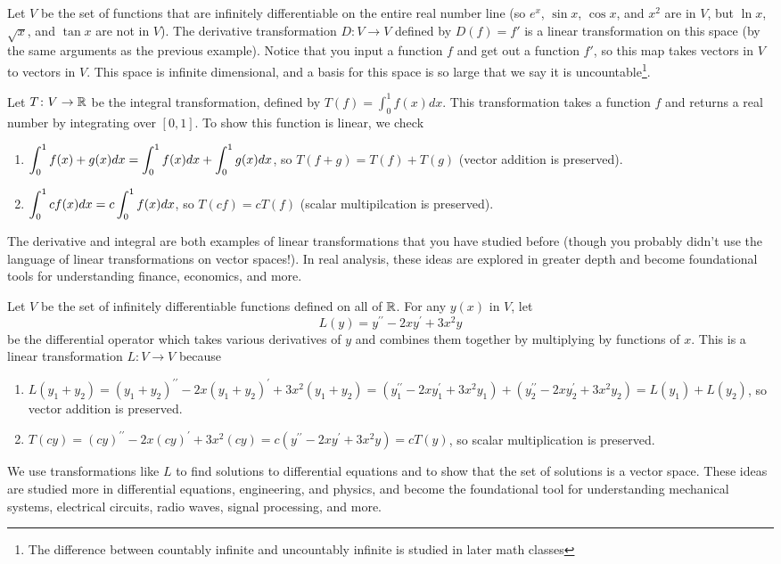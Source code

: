 \begin{example}
Let $V$ be the set of functions that are infinitely differentiable on the entire real number line (so $e^x$, $\sin x$, $\cos x$, and $x^2$ are in $V$, but $\ln x$, $\sqrt{x}$, and $\tan x$ are not in $V$). 
The derivative transformation $D\colon V\to V$ defined by $D(f) = f'$ is a linear transformation on this space (by the same arguments as the previous example). Notice that you input a function $f$ and get out a function $f'$, so this map takes vectors in $V$ to vectors in $V$.  This space is infinite dimensional, and a basis for this space is so large that we say it is uncountable\footnote{The difference between countably infinite and uncountably infinite is studied in later math classes}.

Let $T\colon V\to \mathbb{R}$ be the integral transformation, defined by $T(f)=\int_0^1 f(x)dx$.  This transformation takes a function $f$ and returns a real number by integrating over $[0,1]$.  To show this function is linear, we check
\begin{enumerate}
	\item $\displaystyle \int_0^1 f(x)+g(x)dx=\int_0^1 f(x)dx+\int_0^1 g(x)dx$, so $T(f+g)= T(f)+T(g)$ (vector addition is preserved).
	\item $\displaystyle \int_0^1 cf(x)dx =c\int_0^1 f(x)dx$, so $T(cf) = cT(f)$ (scalar multipilcation is preserved).
\end{enumerate}
The derivative and integral are both examples of linear transformations that you have studied before (though you probably didn't use the language of linear transformations on vector spaces!). In real analysis, these ideas are explored in greater depth and become foundational tools for understanding finance, economics, and more.
\end{example}

\begin{example}
Let $V$ be the set of infinitely differentiable functions defined on all of $\mathbb{R}$.  For any $y(x)$ in $V$, let $$L(y)=y^{\prime\prime}-2xy^\prime+3x^2 y$$ be the differential operator which takes various derivatives of $y$ and combines them together by multiplying by functions of $x$.  This is a linear transformation $L\colon V\to V$ because 
\begin{enumerate}
	\item $L(y_1+y_2)=(y_1+y_2)^{\prime\prime}-2x(y_1+y_2)^\prime+3x^2 (y_1+y_2) = (y_1^{\prime\prime}-2xy_1^\prime+3x^2 y_1) +(y_2^{\prime\prime}-2xy_2^\prime+3x^2 y_2)=L(y_1)+L(y_2)$, so vector addition is preserved.
	\item $T(cy)=(cy)^{\prime\prime}-2x(cy)^\prime+3x^2 (cy) = c(y^{\prime\prime}-2xy^\prime+3x^2 y)=cT(y)$, so scalar multiplication is preserved.
\end{enumerate}
 We use transformations like $L$ to find solutions to differential equations and to show that the set of solutions is a vector space. These ideas are studied more in differential equations, engineering, and physics, and become the foundational tool for understanding mechanical systems, electrical circuits, radio waves, signal processing, and more.  
\end{example}






